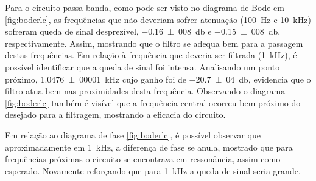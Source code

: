   Para o circuito passa-banda, como pode ser visto no diagrama de Bode em \ref{fig:boderlc}, as frequências que não deveriam sofrer  atenuação (\SI{100}{\hertz} e \SI{10}{\kilo\hertz}) sofreram queda de sinal desprezível, \SI[scientific-notation=false]{-0,16(008)}{\decibel} e \SI[scientific-notation=false]{-0,15(008)}{\decibel}, respectivamente. Assim, mostrando que o filtro se adequa bem para a passagem destas frequências. Em relação à frequência que deveria ser filtrada (\SI{1}{\kilo\hertz}), é possível identificar que a queda de sinal foi intensa. Analisando um ponto próximo, \SI{1,0476(00001)}{\kilo\hertz} cujo ganho foi de \SI{-20,7(04)}{\decibel}, evidencia que o filtro atua bem nas proximidades desta frequência. Observando o diagrama \ref{fig:boderlc} também é visível que a frequência central ocorreu bem próximo do desejado para a filtragem, mostrando a eficacia do circuito.
  \par
Em relação ao diagrama de fase \ref{fig:boderlc}, é possível observar que aproximadamente em \SI{1}{\kilo\hertz}, a diferença de fase se anula, mostrado que para frequências próximas o circuito se encontrava em ressonância, assim como esperado. Novamente reforçando que para \SI{1}{\kilo\hertz} a queda de sinal seria grande. 